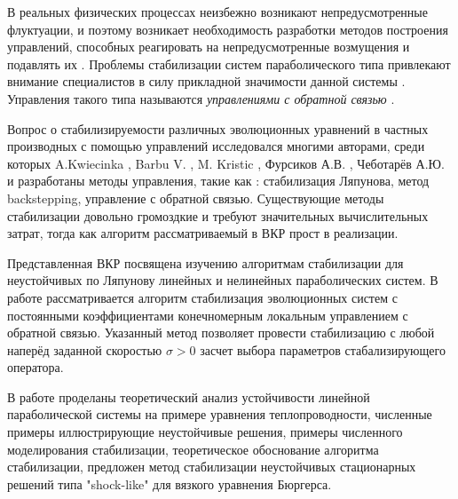 
\Introduction

В реальных физических процессах неизбежно возникают непредусмотренные 
флуктуации, и поэтому возникает необходимость разработки методов построения 
управлений, способных реагировать на непредусмотренные возмущения и подавлять 
их \cite{Furs}. Проблемы стабилизации систем параболического типа привлекают внимание 
специалистов в силу прикладной значимости данной системы \cite{Chebotarev}. 
Управления такого типа называются \emph{управлениями с обратной связью} \cite{KS}.

Вопрос о стабилизируемости различных эволюционных уравнений в частных 
производных с помощью управлений исследовался многими авторами, среди которых 
A.Kwiecinka \cite{KWCK}, Barbu V. \cite{Barbu}, M. Kristic
\cite{KMV, KS}, Фурсиков А.В. \cite{Furs}, Чеботарёв А.Ю. 
\cite{Chebotarev, ChebotarevBS, ChebotarevMGT} и разработаны методы управления, 
такие как : стабилизация Ляпунова, метод backstepping, управление с обратной
связью. Существующие методы стабилизации довольно громоздкие и требуют значительных 
вычислительных затрат, тогда как алгоритм рассматриваемый в ВКР прост в реализации.

Представленная ВКР посвящена изучению алгоритмам стабилизации для неустойчивых
по Ляпунову линейных и нелинейных параболических систем. В работе
рассматривается алгоритм стабилизация эволюционных систем с постоянными коэффициентами 
конечномерным локальным управлением с обратной связью. Указанный
метод позволяет провести стабилизацию с любой наперёд заданной скоростью $\sigma
> 0$ засчет выбора параметров стабализирующего оператора.

В работе проделаны теоретический анализ устойчивости линейной параболической
системы на примере уравнения теплопроводности, численные примеры иллюстрирующие
неустойчивые решения, примеры численного моделирования стабилизации, теоретическое
обоснование алгоритма стабилизации, предложен метод стабилизации неустойчивых
стационарных решений типа "shock-like" для вязкого уравнения Бюргерса.
